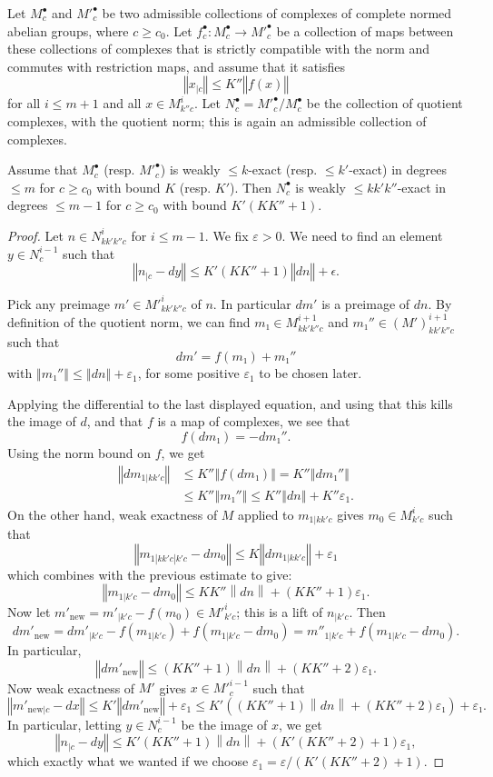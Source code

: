\begin{proposition}
  \label{weaksnakelemma}
  \leanok
  Let $M^\bullet_c$ and $M'^\bullet_c$ be two admissible collections
  of complexes of complete normed abelian groups, where $c\geq c_0$.
  Let $f^\bullet_c: M^\bullet_c\to M'^\bullet_c$ be a collection of maps
  between these collections of complexes
  that is strictly compatible with the norm and commutes with restriction maps,
  and assume that it satisfies
  \[
    ‖x_{|c}‖ ≤ K''‖f(x)‖
  \]
  for all $i ≤ m+1$ and all $x\in M^i_{k''c}$.
  Let $N^\bullet_c=M'^\bullet_c/M^\bullet_c$
  be the collection of quotient complexes, with the quotient norm;
  this is again an admissible collection of complexes.

  Assume that $M^\bullet_c$ (resp. $M'^\bullet_c$) is weakly $\leq k$-exact
  (resp. $≤ k'$-exact) in degrees $\leq m$ for $c\geq c_0$ with bound $K$
  (resp. $K'$).
  Then $N^\bullet_c$ is weakly $\leq kk'k''$-exact in degrees $\leq m-1$ for $c\geq c_0$
  with bound $K'(KK'' + 1)$.
\end{proposition}

\begin{proof}
\leanok
\def\ndn{\left\|dn\right\|}
Let $n \in N^i_{kk'k''c}$ for $i\leq m-1$.
We fix $ε > 0$. We need to find an element $y \in N^{i-1}_c$ such that
\[
  ‖n_{|c} - dy‖ \leq K'(KK'' + 1)‖dn‖ + \epsilon.
\]

Pick any preimage $m' \in M'^i_{kk'k''c}$ of $n$. In particular $dm'$ is
a preimage of $dn$.
By definition of the quotient norm,
we can find $m₁ ∈ M^{i+1}_{kk'k''c}$ and $m₁'' ∈ (M')^{i+1}_{kk'k''c}$ such that
\[
dm' = f(m₁) + m₁''
\]
with $‖m₁''‖ \leq ‖dn‖ + ε_1$, for some positive $ε_1$ to be chosen later.

Applying the differential to the last displayed equation, and using that this
kills the image of $d$, and that $f$ is a map of complexes, we see that
\[
f(dm₁) = -dm₁''.
\]
Using the norm bound on $f$, we get
\[\begin{aligned}
  ‖dm_{1|kk'c}‖ &≤ K''‖f(dm₁)‖ = K''‖dm₁''‖\\
                &≤ K''‖m₁''‖ ≤ K''‖dn‖ + K''ε_1.
\end{aligned}\]
On the other hand, weak exactness of $M$ applied to $m_{1|kk'c}$
gives $m_0 ∈ M^i_{k'c}$ such that
\[
  ‖m_{1|kk'c|k'c} - dm_0‖ \leq K‖dm_{1|kk'c}‖ + ε_1
\]
which combines with the previous estimate to give:
\[
  ‖m_{1|k'c} - dm_0‖ \leq K K'' \left\|d n\right\| + (KK'' + 1)ε_1.
\]
Now let $m'_{\mathrm{new}} = m'_{|k'c} - f(m_0) \in M'^i_{k'c}$; this is a lift of $n_{|k'c}$.
Then
\[
dm'_{\mathrm{new}} = dm'_{|k'c} - f(m_{1|k'c}) + f(m_{1|k'c} - dm_0) = m''_{1|k'c} + f(m_{1|k'c} - dm_0).
\]
In particular,
\[
‖dm'_{\mathrm{new}}‖ ≤ (KK'' + 1)\ndn + (KK'' + 2) ε_1.
\]
Now weak exactness of $M'$ gives $x \in M'^{i-1}_c$ such that
\[
  ‖m'_{\mathrm{new}|c} - dx‖ ≤ K'‖dm'_\mathrm{new}‖ + ε_1 \leq
    K'((K K'' + 1) \ndn + (KK'' + 2) ε₁) + ε₁.
\]
In particular, letting $y \in N^{i-1}_c$ be the image of $x$, we get
\[
  ‖n_{|c} - dy‖ ≤ K'(K K'' + 1)\ndn + (K'(K  K'' + 2) + 1) ε_1,
\]
which exactly what we wanted if we choose
$ε_1 = ε/(K'(K  K'' + 2) + 1)$.
\end{proof}


